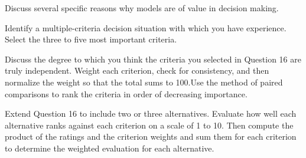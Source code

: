 \begin{exercises}
    \begin{exercise}
    \label{sea-7-15}
        Discuss several specific reasons why models are of value in decision making.
    \end{exercise}
    \begin{solution}
    \end{solution}
    
    \begin{exercise}
    \label{sea-7-16}
        Identify a multiple-criteria decision situation with which you have experience. Select the three to five most important criteria.
    \end{exercise}
    \begin{solution}
    \end{solution}
    
    \begin{exercise}
    \label{sea-7-17}
        Discuss the degree to which you think the criteria you selected in Question 16 are truly independent. Weight each criterion, check for consistency, and then normalize the weight so that the total sums to 100.Use the method of paired comparisons to rank the criteria in order of decreasing importance.
    \end{exercise}
    \begin{solution}
    \end{solution}
    
    \begin{exercise}
    \label{sea-7-18}
        Extend Question 16 to include two or three alternatives. Evaluate how well each alternative ranks against each criterion on a scale of 1 to 10. Then compute the product of the ratings and the criterion weights and sum them for each criterion to determine the weighted evaluation for each alternative.
    \end{exercise}
    \begin{solution}
    \end{solution}
    

\end{exercises}
